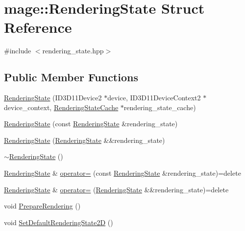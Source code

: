 \hypertarget{structmage_1_1_rendering_state}{}\section{mage\+:\+:Rendering\+State Struct Reference}
\label{structmage_1_1_rendering_state}


{\ttfamily \#include $<$rendering\+\_\+state.\+hpp$>$}

\subsection*{Public Member Functions}
\begin{DoxyCompactItemize}
\item 
\hyperlink{structmage_1_1_rendering_state_a6a1914effafb160ff1d05c8a1963278a}{Rendering\+State} (I\+D3\+D11\+Device2 $\ast$device, I\+D3\+D11\+Device\+Context2 $\ast$device\+\_\+context, \hyperlink{structmage_1_1_rendering_state_cache}{Rendering\+State\+Cache} $\ast$rendering\+\_\+state\+\_\+cache)
\item 
\hyperlink{structmage_1_1_rendering_state_aa56cf6681d7e9e59124534dfea51be15}{Rendering\+State} (const \hyperlink{structmage_1_1_rendering_state}{Rendering\+State} \&rendering\+\_\+state)
\item 
\hyperlink{structmage_1_1_rendering_state_a70c843e9c1923d4b0d855fa7a57f38bd}{Rendering\+State} (\hyperlink{structmage_1_1_rendering_state}{Rendering\+State} \&\&rendering\+\_\+state)
\item 
\hyperlink{structmage_1_1_rendering_state_aaf45726193df68d65acffbbbf699cfa3}{$\sim$\+Rendering\+State} ()
\item 
\hyperlink{structmage_1_1_rendering_state}{Rendering\+State} \& \hyperlink{structmage_1_1_rendering_state_af03ad38dd9b88949fc9d3603e4829c26}{operator=} (const \hyperlink{structmage_1_1_rendering_state}{Rendering\+State} \&rendering\+\_\+state)=delete
\item 
\hyperlink{structmage_1_1_rendering_state}{Rendering\+State} \& \hyperlink{structmage_1_1_rendering_state_ad16e9963683b1eda6cbe675b8b210368}{operator=} (\hyperlink{structmage_1_1_rendering_state}{Rendering\+State} \&\&rendering\+\_\+state)=delete
\item 
void \hyperlink{structmage_1_1_rendering_state_ac685d7f5b0832bc4af9e09ed3f50bf22}{Prepare\+Rendering} ()
\item 
void \hyperlink{structmage_1_1_rendering_state_aa8279c1177941c8f14502fc9c7296655}{Set\+Default\+Rendering\+State2D} ()

\end{DoxyCompactItemize}
